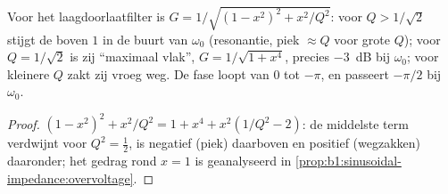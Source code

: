 \begin{proposition}\label{prop:b1:filters-transfer-functions:lowpass2}
Voor het laagdoorlaatfilter is $G = 1/\sqrt{(1 - x^2)^2 + x^2/Q^2}$: voor
$Q > 1/\sqrt2$ stijgt de  boven $1$ in de buurt van $\omega_0$ (resonantie, piek
$\approx Q$ voor grote $Q$); voor $Q = 1/\sqrt2$ is zij ``maximaal vlak'',
$G = 1/\sqrt{1 + x^4}$, precies \qty{-3}{dB} bij $\omega_0$; voor kleinere
$Q$ zakt zij vroeg weg. De fase loopt van $0$ tot $-\pi$, en passeert $-\pi/2$
bij $\omega_0$.
\end{proposition}

\begin{proof}
$(1 - x^2)^2 + x^2/Q^2 = 1 + x^4 + x^2(1/Q^2 - 2)$: de middelste term
verdwijnt voor $Q^2 = \tfrac12$, is negatief (piek) daarboven en positief
(wegzakken) daaronder; het gedrag rond $x = 1$ is geanalyseerd in
\cref{prop:b1:sinusoidal-impedance:overvoltage}.
\end{proof}

